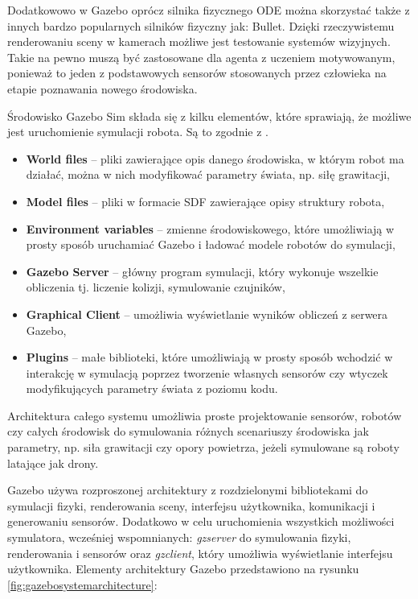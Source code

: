 Dodatkowowo w Gazebo oprócz silnika fizycznego ODE można skorzystać także z innych
bardzo popularnych silników fizyczny jak: Bullet. Dzięki rzeczywistemu renderowaniu
sceny w kamerach możliwe jest testowanie systemów wizyjnych. Takie na pewno
muszą być zastosowane dla agenta z uczeniem motywowanym, ponieważ to jeden
z podstawowych sensorów stosowanych przez człowieka na etapie poznawania nowego
środowiska.

Środowisko Gazebo Sim składa się z kilku elementów, które sprawiają, że możliwe
jest uruchomienie symulacji robota. Są to zgodnie z \cite{gazebo_components}.

\begin{itemize}
    \item \textbf{World files} -- pliki zawierające opis danego środowiska, 
    w którym robot ma działać, można w nich modyfikować parametry świata, 
    np. siłę grawitacji,
    \item \textbf{Model files} -- pliki w formacie SDF zawierające opisy 
    struktury robota,
    \item \textbf{Environment variables} -- zmienne środowiskowego, które 
    umożliwiają w prosty sposób uruchamiać Gazebo i ładować modele robotów 
    do symulacji,
    \item \textbf{Gazebo Server} -- główny program symulacji, który wykonuje 
    wszelkie obliczenia tj. liczenie kolizji, symulowanie czujników,
    \item \textbf{Graphical Client} -- umożliwia wyświetlanie wyników 
    obliczeń z serwera Gazebo,
    \item \textbf{Plugins} -- małe biblioteki, które umożliwiają w prosty 
    sposób wchodzić w interakcję w symulacją poprzez tworzenie własnych 
    sensorów czy wtyczek modyfikujących parametry świata z poziomu kodu.
\end{itemize}

Architektura całego systemu umożliwia proste projektowanie sensorów, robotów
czy całych środowisk do symulowania różnych scenariuszy środowiska jak 
parametry, np. siła grawitacji czy opory powietrza, jeżeli symulowane są roboty
latające jak drony. 

Gazebo używa rozproszonej architektury z rozdzielonymi bibliotekami do 
symulacji fizyki, renderowania sceny, interfejsu użytkownika, komunikacji i 
generowaniu sensorów. Dodatkowo w celu uruchomienia wszystkich możliwości 
symulatora, wcześniej wspomnianych: \textit{gzserver} do symulowania fizyki, 
renderowania i sensorów oraz \textit{gzclient}, który umożliwia wyświetlanie 
interfejsu użytkownika. Elementy architektury Gazebo przedstawiono na rysunku 
\ref{fig:gazebosystemarchitecture}:

